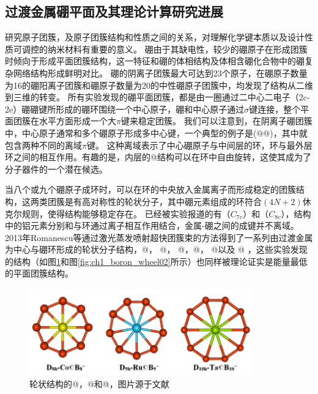 \subsection{过渡金属硼平面及其理论计算研究进展}
研究原子团簇，及原子团簇结构和性质之间的关系，对理解化学键本质以及设计性质可调控的纳米材料有重要的意义。
硼由于其缺电性，较少的硼原子在形成团簇时倾向于形成平面团簇结构\cite{xu2017practical}，这一特征和硼的体相结构及体相含硼化合物中的硼复杂网络结构形成鲜明对比。
硼的阴离子团簇最大可达到23个原子\cite{alexandrova2004molecular,alexandrova2004electronic,kiran2005planar,alexandrova2006all,sergeeva2008photoelectron,huang2010concentric,sergeeva2011all,piazza2012photoelectron,sergeeva2012b22,zhai2003hydrocarbon,zhai2003hepta}，在硼原子数量为16的硼阳离子团簇和硼原子数量为20的中性硼原子团簇中，均发现了结构从二维到三维的转变\cite{kiran2005planar,tai2012structure,oger2007boron}。
所有实验发现的硼平面团簇\cite{romanescu2013transition}，都是由一圈通过二中心二电子（2c-2e）硼硼键所形成的硼环围绕一个中心原子，硼和中心原子通过$\sigma$键连接，整个平面团簇在水平方面形成一个大$\pi$键来稳定团簇。
我们可以注意到，在阴离子硼团簇中，中心原子通常和多个硼原子形成多中心键，一个典型的例子是(@@)\cite{huang2010concentric}，其中就包含两种不同的离域$\pi$键。
这种离域表示了中心硼原子与中间层的环，环与最外层环之间的相互作用。有趣的是，内层的@结构可以在环中自由旋转，这使其成为了分子器件的一个潜在候选。

当八个或九个硼原子成环时，可以在环的中央放入金属离子而形成稳定的团簇结构，这两类团簇是有高对称性的轮状分子，其中硼元素组成的环符合$(4N+2)$休克尔规则，使得结构能够稳定存在\cite{zhai2003hepta,alexandrova2004molecular}。
已经被实验报道的有（$C_{7v}$）和（$C_{8v}$）\cite{galeev2011valence}，结构中的铝元素分别和与环通过离子相互作用结合，金属-硼之间的成键并不离域。2013年Romanescu等通过激光蒸发喷射超快团簇束的方法得到了一系列由过渡金属为中心与硼环形成的轮状分子结构，@， @， @，@， @以及 @ \cite{romanescu2011aromatic,galeev2011valence,li2012transition}，这些实验发现的结构（如图\ref{fig:ch1_boron_wheel01}和图\ref{fig:ch1_boron_wheel02}所示）也同样被理论证实是能量最低的平面团簇结构。

\begin{figure}
  \includegraphics[width=0.86\textwidth]{figs/ch1_boron_wheel01.png}
  \centering
  \caption{轮状结构的@，@和@，图片源于文献\cite{romanescu2013transition}}
  \label{fig:ch1_boron_wheel01}
\end{figure}

